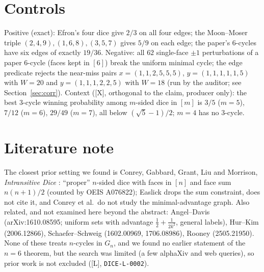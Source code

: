 \documentclass[10pt]{article}
\newcommand{\tier}[1]{\textsf{[#1]}}
\newcommand{\tL}{\tier{L}}
\newcommand{\tX}{\tier{X}}
\begin{document}
\section{Controls}\label{sec:ctrl}
Positive (exact): Efron's four dice give $2/3$ on all four edges; the Moon--Moser triple $(2,4,9),(1,6,8),(3,5,7)$ gives $5/9$ on each edge; the paper's $6$-cycles have six edges of exactly $19/36$. Negative: all $62$ single-face $\pm1$ perturbations of a paper $6$-cycle (faces kept in $[6]$) break the uniform minimal cycle; the edge predicate rejects the near-miss pairs $x=(1,1,2,5,5,5)$, $y=(1,1,1,1,1,5)$ with $W=20$ and $y=(1,1,1,2,2,5)$ with $W=18$ (run by the auditor; see Section~\ref{sec:corr}). Context (\tX{}, orthogonal to the claim, producer only): the best $3$-cycle winning probability among $m$-sided dice in $[m]$ is $3/5$ ($m=5$), $7/12$ ($m=6$), $29/49$ ($m=7$), all below $(\sqrt5-1)/2$; $m=4$ has no $3$-cycle.

\section{Literature note}\label{sec:lit}
The closest prior setting we found is Conrey, Gabbard, Grant, Liu and Morrison, \emph{Intransitive Dice} \cite{conrey}: ``proper'' $n$-sided dice with faces in $[n]$ and face sum $n(n+1)/2$ (counted by OEIS A076822); Easlick drops the sum constraint, does not cite it, and Conrey et al.\ do not study the minimal-advantage graph. Also related, and not examined here beyond the abstract: Angel--Davis (arXiv:1610.08595; uniform sets with advantage $\tfrac12+\tfrac1{2k^2}$, general labels), Hur--Kim (2006.12866), Schaefer--Schweig (1602.00969, 1706.08986), Rooney (2505.21950). None of these treats $n$-cycles in $G_n$, and we found no earlier statement of the $n=6$ theorem, but the search was limited (a few alphaXiv and web queries), so prior work is not excluded (\tL{}, \texttt{DICE-L-0002}).
\end{document}
